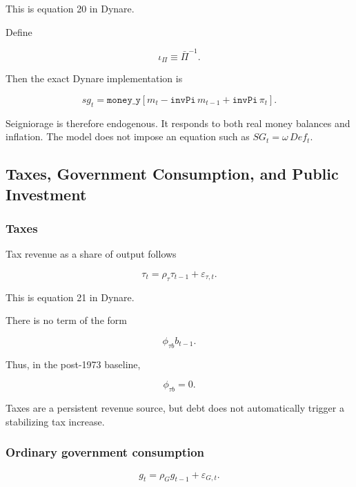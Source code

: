 This is equation 20 in Dynare.

Define

\[
\iota_\Pi\equiv\bar\Pi^{-1}.
\]

Then the exact Dynare implementation is

\[
sg_t
=
\texttt{money\_y}
\left[
m_t
-
\texttt{invPi}\,m_{t-1}
+
\texttt{invPi}\,\pi_t
\right].
\]

Seigniorage is therefore endogenous. It responds to both real money balances
and inflation. The model does not impose an equation such as
\(SG_t=\omega\,Def_t\).

\subsection{Taxes, Government Consumption, and Public Investment}
\label{app:fiscal_processes}

\subsubsection{Taxes}

Tax revenue as a share of output follows

\begin{equation}
\boxed{
\tau_t
=
\rho_\tau\tau_{t-1}
+
\varepsilon_{\tau,t}.
}
\label{eq:tau_final}
\end{equation}

This is equation 21 in Dynare.

There is no term of the form

\[
\phi_{\tau b}b_{t-1}.
\]

Thus, in the post-1973 baseline,

\begin{equation}
\boxed{
\phi_{\tau b}=0.
}
\end{equation}

Taxes are a persistent revenue source, but debt does not automatically trigger
a stabilizing tax increase.

\subsubsection{Ordinary government consumption}

\begin{equation}
\boxed{
g_t
=
\rho_Gg_{t-1}
+
\varepsilon_{G,t}.
}
\label{eq:g_final}
\end{equation}

